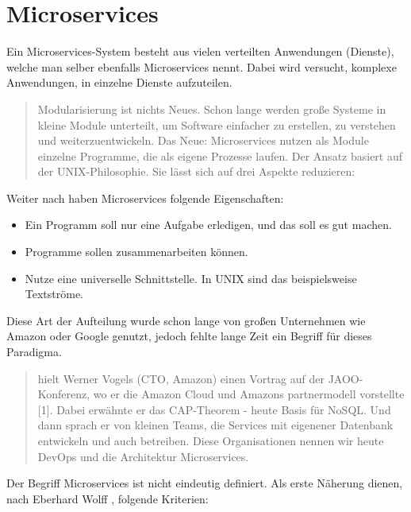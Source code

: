 \chapter{Microservices}
\label{chap:Microservices}
Ein Microservices-System besteht aus vielen verteilten Anwendungen (Dienste), welche man selber ebenfalls Microservices nennt. Dabei wird versucht, komplexe Anwendungen, in einzelne Dienste aufzuteilen.

\begin{quotation}
    \frqq Modularisierung ist nichts Neues. Schon lange werden große Systeme in kleine Module unterteilt, um Software einfacher zu erstellen, zu verstehen und weiterzuentwickeln. Das Neue: Microservices nutzen als Module einzelne Programme, die als eigene Prozesse laufen. Der Ansatz basiert auf der UNIX-Philosophie. Sie lässt sich auf drei Aspekte reduzieren:\flqq\cite[S. 2]{EWolff2016:Microservices}
\end{quotation}

Weiter nach \cite[S. 2]{EWolff2016:Microservices} haben Microservices folgende Eigenschaften:
\begin{itemize}
    \item Ein Programm soll nur eine Aufgabe erledigen, und das soll es gut machen.
    \item Programme sollen zusammenarbeiten können.
    \item Nutze eine universelle Schnittstelle. In UNIX sind das beispielsweise Textströme.
\end{itemize}

Diese Art der Aufteilung wurde schon lange von großen Unternehmen wie Amazon oder Google genutzt, jedoch fehlte lange Zeit ein Begriff für dieses Paradigma.

\begin{quotation}
     hielt Werner Vogels (CTO, Amazon) einen Vortrag auf der JAOO-Konferenz, wo er die Amazon Cloud und Amazons partnermodell vorstellte [1]. Dabei erwähnte er das CAP-Theorem - heute Basis für NoSQL. Und dann sprach er von kleinen Teams, die Services mit eigenener Datenbank entwickeln und auch betreiben. Diese Organisationen nennen wir heute DevOps und die Architektur Microservices.\flqq\ \cite[S. 13]{EWolff2016:Microservices}
\end{quotation}

Der Begriff Microservices ist nicht eindeutig definiert. Als erste Näherung dienen, nach Eberhard Wolff \cite[S. 2]{EWolff2016:Microservices}, folgende Kriterien:

